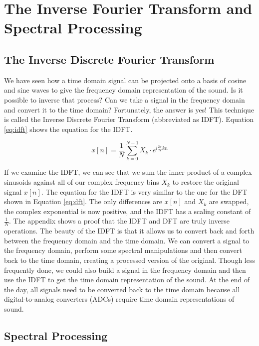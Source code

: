 \section*{The Inverse Fourier Transform and Spectral Processing}

\subsection*{The Inverse Discrete Fourier Transform}

We have seen how a time domain signal can be projected onto a basis of cosine and sine waves to give the
frequency domain representation of the sound.  Is it possible to inverse that process?  Can we take a signal
in the frequency domain and convert it to the time domain?  Fortunately, the answer is yes!  This technique
is called the Inverse Discrete Fourier Transform (abbreviated as IDFT).  Equation \ref{eq:idft} shows the equation
for the IDFT.  

\begin{equation}
	\label{eq:idft}
	x[n] = \frac{1}{N}\sum_{k = 0}^{N - 1}X_k \cdot e^{i\frac{2\pi}{N}kn}
\end{equation}

If we examine the IDFT, we can see that we sum the inner product of a complex sinusoids against all of our 
complex frequency bins $X_k$ to restore the original signal $x[n]$.  The equation for the IDFT is very similar
to the one for the DFT shown in Equation \ref{eq:dft}.  The only differences are $x[n]$ and $X_k$ are swapped,
the complex exponential is now positive, and the IDFT has a scaling constant of $\frac{1}{N}$.  The appendix
shows a proof that the IDFT and DFT are truly inverse operations.  The beauty of the IDFT is that it allows us
to convert back and forth between the frequency domain and the time domain.  We can convert a signal to the
frequency domain, perform some spectral manipulations and then convert back to the time domain, creating
a processed version of the original.  Though less frequently done, we could also build a signal in the frequency
domain and then use the IDFT to get the time domain representation of the sound.  At the end of the day, all 
signals need to be converted back to the time domain because all digital-to-analog converters (ADCs) require
time domain representations of sound.

\subsection*{Spectral Processing}

